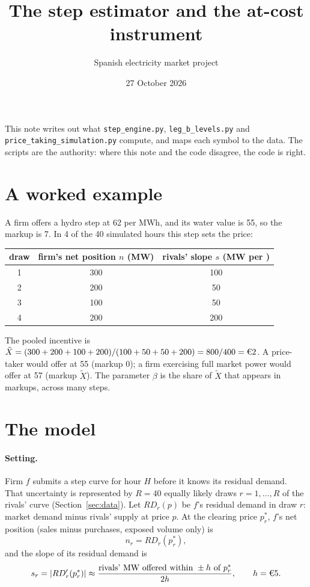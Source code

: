 \documentclass[11pt]{article}
\title{The step estimator and the at-cost instrument}
\author{Spanish electricity market project}
\date{27 October 2026}
\newcommand{\Xt}{\tilde X}
\newcommand{\eur}{\text{\texteuro}}
\newcommand{\code}[1]{\texttt{\small #1}}
\begin{document}
\maketitle

\noindent This note writes out what \code{step\_engine.py}, \code{leg\_b\_levels.py} and
\code{price\_taking\_simulation.py} compute, and maps each symbol to the data. The scripts
are the authority: where this note and the code disagree, the code is right.

\section{A worked example}

A firm offers a hydro step at \eur62 per MWh, and its water value is \eur55, so the markup
is \eur7. In 4 of the 40 simulated hours this step sets the price:

\begin{center}
\begin{tabular}{ccc}
\toprule
draw & firm's net position $n$ (MW) & rivals' slope $s$ (MW per \eur) \\
\midrule
1 & 300 & 100 \\
2 & 200 & 50 \\
3 & 100 & 50 \\
4 & 200 & 200 \\
\bottomrule
\end{tabular}
\end{center}

\noindent The pooled incentive is $\Xt = (300+200+100+200)/(100+50+50+200) = 800/400 =
\eur2$. A price-taker would offer at \eur55 (markup 0); a firm exercising full market power
would offer at \eur57 (markup $\Xt$). The parameter $\beta$ is the share of $\Xt$ that
appears in markups, across many steps.

\section{The model}

\paragraph{Setting.} Firm $f$ submits a step curve for hour $H$ before it knows its residual
demand. That uncertainty is represented by $R=40$ equally likely draws $r=1,\dots,R$ of the
rivals' curve (Section~\ref{sec:data}). Let $RD_r(p)$ be $f$'s residual demand in draw $r$:
market demand minus rivals' supply at price $p$. At the clearing price $p_r^*$, $f$'s net
position (sales minus purchases, exposed volume only) is
\[
  n_r = RD_r(p_r^*),
\]
and the slope of its residual demand is
\[
  s_r = \lvert RD_r'(p_r^*)\rvert \approx
  \frac{\text{rivals' MW offered within } \pm h \text{ of } p_r^*}{2h}, \qquad h = \eur5.
\]
\end{document}
